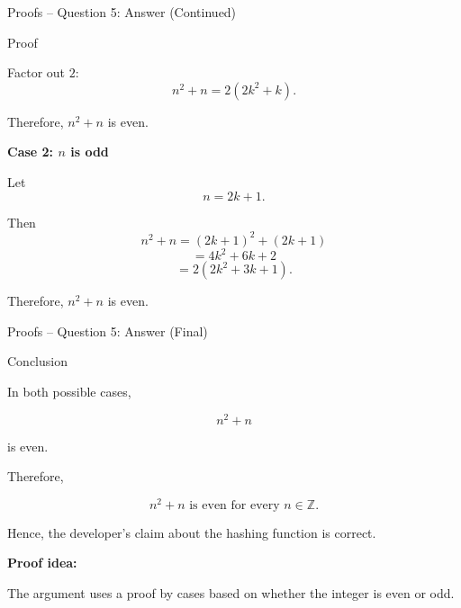 
\begin{frame}{Proofs -- Question 5: Answer (Continued)}
\vspace{-0.5cm}
\begin{exampleblock}{Proof}

Factor out $2$:
\[
n^2+n
=
2(2k^2+k).
\]

Therefore, $n^2+n$ is even.

\medskip

\textbf{Case 2: $n$ is odd}

Let
\[
n=2k+1.
\]

Then
\[
n^2+n
=
(2k+1)^2+(2k+1)
\]
\[
=4k^2+6k+2
\]
\[
=2(2k^2+3k+1).
\]

Therefore, $n^2+n$ is even.

\end{exampleblock}

\end{frame}


\begin{frame}{Proofs -- Question 5: Answer (Final)}

\begin{exampleblock}{Conclusion}

In both possible cases,

\[
n^2+n
\]

is even.

Therefore,

\[
\boxed{n^2+n\text{ is even for every }n\in\mathbb{Z}.}
\]

Hence, the developer's claim about the hashing function is correct.

\medskip

\textbf{Proof idea:}

The argument uses a proof by cases based on whether the integer is even
or odd.

\end{exampleblock}

\end{frame}

